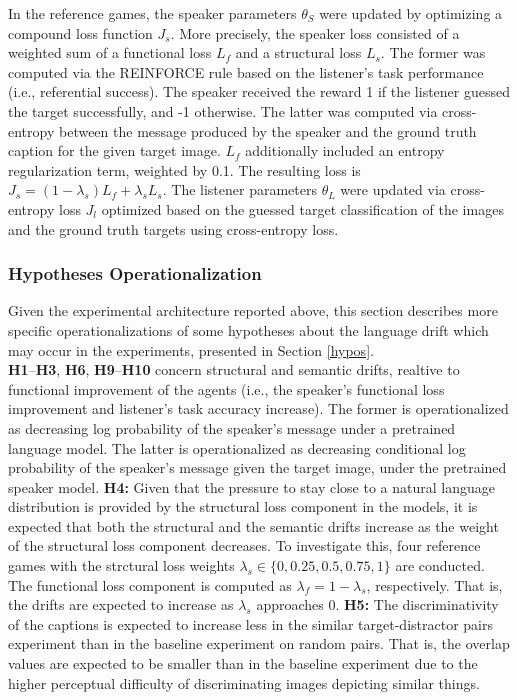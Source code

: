 In the reference games, the speaker parameters $\theta_S$ were updated by optimizing a compound loss function $J_s$. More precisely, the speaker loss consisted of a weighted sum of a functional loss $L_f$ and a structural loss $L_s$. The former was computed via the REINFORCE rule based on the listener's task performance (i.e., referential success). The speaker received the reward 1 if the listener guessed the target successfully, and -1 otherwise. The latter was computed via cross-entropy between the message produced by the speaker and the ground truth caption for the given target image. $L_f$ additionally included an entropy regularization term, weighted by 0.1. The resulting loss is $J_s = (1-\lambda_s)L_f + \lambda_s L_s$. 
The listener parameters $\theta_L$ were updated via cross-entropy loss $J_l$ optimized based on the guessed target classification of the images and the ground truth targets using cross-entropy loss. 

\subsubsection{Hypotheses Operationalization}
Given the experimental architecture reported above, this section describes more specific operationalizations of some hypotheses about the language drift which may occur in the experiments, presented in Section \ref{hypos}.\\
\newline
\textbf{H1}--\textbf{H3}, \textbf{H6}, \textbf{H9}--\textbf{H10} concern structural and semantic drifts, realtive to functional improvement of the agents (i.e., the speaker's functional loss improvement and listener's task accuracy increase). The former is operationalized as decreasing log probability of the speaker's message under a pretrained language model. The latter is operationalized as decreasing conditional log probability of the speaker's message given the target image, under the pretrained speaker model. \newline
\textbf{H4:} Given that the pressure to stay close to a natural language distribution is provided by the structural loss component in the models, it is expected that both the structural and the semantic drifts increase as the weight of the structural loss component decreases. To investigate this, four reference games with the strctural loss weights $\lambda_s \in \{0, 0.25, 0.5, 0.75, 1\}$ are conducted. The functional loss component is computed as $\lambda_f = 1 - \lambda_s$, respectively. That is, the drifts are expected to increase as $\lambda_s$ approaches 0.\newline
\textbf{H5:} The discriminativity of the captions is expected to increase less in the similar target-distractor pairs experiment than in the baseline experiment on random pairs. That is, the overlap values are expected to be smaller than in the baseline experiment due to the higher perceptual difficulty of discriminating images depicting similar things. 

